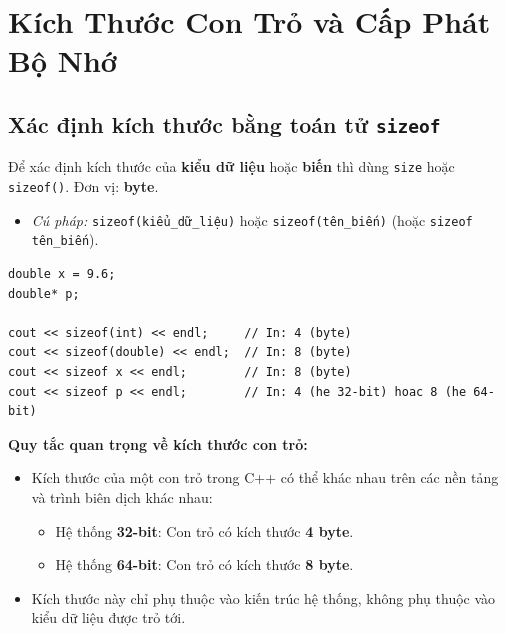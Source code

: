 \documentclass[12pt,a4paper]{article}
\begin{document}
\section{Kích Thước Con Trỏ và Cấp Phát Bộ Nhớ}

\subsection{Xác định kích thước bằng toán tử \texttt{sizeof}}
Để xác định kích thước của \textbf{kiểu dữ liệu} hoặc \textbf{biến} thì dùng \texttt{size} hoặc \texttt{sizeof()}. Đơn vị: \textbf{byte}.
\begin{itemize}[itemsep=0.15em]
    \item \textit{Cú pháp:} \texttt{sizeof(kiểu\_dữ\_liệu)} hoặc \texttt{sizeof(tên\_biến)} (hoặc \texttt{sizeof tên\_biến}).
\end{itemize}
\begin{lstlisting}
double x = 9.6;
double* p;

cout << sizeof(int) << endl;     // In: 4 (byte)
cout << sizeof(double) << endl;  // In: 8 (byte)
cout << sizeof x << endl;        // In: 8 (byte)
cout << sizeof p << endl;        // In: 4 (he 32-bit) hoac 8 (he 64-bit)
\end{lstlisting}

\noindent\textbf{Quy tắc quan trọng về kích thước con trỏ:}
\begin{itemize}[itemsep=0.15em]
    \item Kích thước của một con trỏ trong C++ có thể khác nhau trên các nền tảng và trình biên dịch khác nhau:
    \begin{itemize}
        \item Hệ thống \textbf{32-bit}: Con trỏ có kích thước \textbf{4 byte}.
        \item Hệ thống \textbf{64-bit}: Con trỏ có kích thước \textbf{8 byte}.
    \end{itemize}
    \item Kích thước này chỉ phụ thuộc vào kiến trúc hệ thống, không phụ thuộc vào kiểu dữ liệu được trỏ tới.
\end{itemize}
\end{document}

